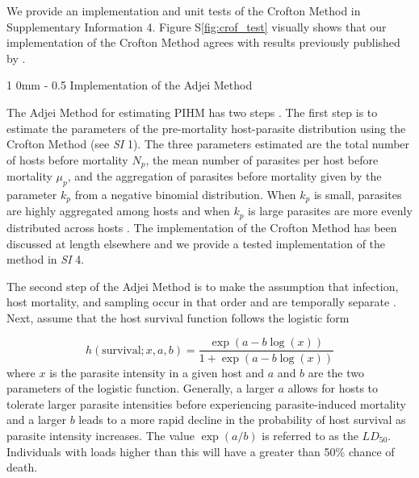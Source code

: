 \documentclass[12pt, a4paper]{article}
\makeatletter
\renewcommand{\section}{\@startsection
{section}%
{1}%
{0mm}%
{-\baselineskip}%
{0.5\baselineskip}%
{\normalfont\bf\large}} %
\makeatother
\begin{document}
We provide an implementation and unit tests of the Crofton Method in  Supplementary Information 4.  Figure S\ref{fig:crof_test} visually shows that our implementation of the Crofton Method agrees with results previously published by \cite{Crofton1971a}.

\section{Implementation of the Adjei Method}

The Adjei Method for estimating PIHM has two steps \citep{Adjei1986}.  The first
step is to estimate the parameters of the pre-mortality host-parasite
distribution using the Crofton Method (see \emph{SI} 1).  The three parameters estimated are the
total number of hosts before mortality $N_p$,  the mean number of parasites per
host before mortality $\mu_p$, and the aggregation of parasites before
mortality given by the parameter $k_p$ from a negative binomial distribution.
When $k_p$ is small, parasites are highly aggregated among hosts and when
$k_p$ is large parasites are more evenly distributed across hosts \citep{Wilson2002}.  The implementation of the Crofton Method has been discussed at length elsewhere \citep[e.g.][ and in \emph{SI} 1]{Royce1990,Lester1984} and we provide a tested implementation of the method in \emph{SI} 4.

The second step of the Adjei Method is to make the assumption that infection, host mortality, and sampling occur in that order and are temporally separate \citep{Adjei1986}. Next, \citeauthor{Adjei1986} assume that the host survival function follows the logistic form

\begin{equation}
    h(\text{survival}; x, a, b) = \dfrac{\exp{(a - b \log(x))}}{1 + \exp{(a - b \log(x))}}
    \label{eq:logistic}
\end{equation}
where $x$ is the parasite intensity in a given host and $a$ and $b$ are the two
parameters of the logistic function. Generally, a larger $a$ allows for hosts to
tolerate larger parasite intensities before experiencing parasite-induced mortality
and a larger $b$ leads to a more rapid decline in the probability of host
survival as parasite intensity increases. The value $\exp(a / b)$ is referred
to as the $LD_{50}$. Individuals with loads higher than this will have a greater than 50\% chance of death.
\end{document}
